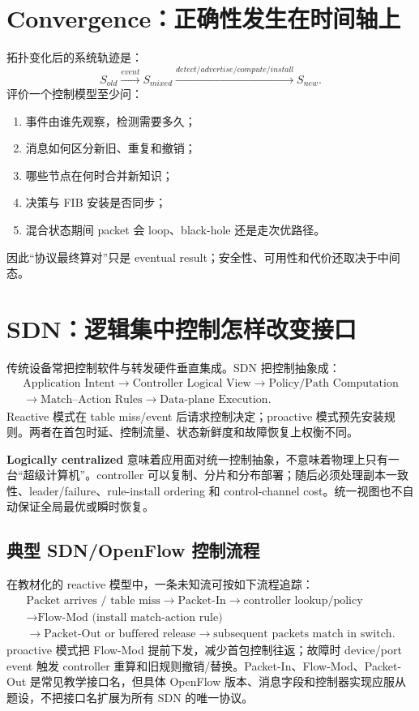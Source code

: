 \documentclass[11pt,a4paper]{ctexart}
\newcommand{\kw}[1]{\textbf{\color{deep}#1}}
\begin{document}
\section{Convergence：正确性发生在时间轴上}

拓扑变化后的系统轨迹是：
\[
S_{old}\xrightarrow{event}S_{mixed}
\xrightarrow{detect/advertise/compute/install}S_{new}.
\]
评价一个控制模型至少问：
\begin{enumerate}
  \item 事件由谁先观察，检测需要多久；
  \item 消息如何区分新旧、重复和撤销；
  \item 哪些节点在何时合并新知识；
  \item 决策与 FIB 安装是否同步；
  \item 混合状态期间 packet 会 loop、black-hole 还是走次优路径。
\end{enumerate}

因此“协议最终算对”只是 eventual result；安全性、可用性和代价还取决于中间态。

\section{SDN：逻辑集中控制怎样改变接口}

传统设备常把控制软件与转发硬件垂直集成。SDN 把控制抽象成：
\[
\begin{gathered}
\text{Application Intent}\to\text{Controller Logical View}\to\text{Policy/Path Computation}\\
\to\text{Match--Action Rules}\to\text{Data-plane Execution}.
\end{gathered}
\]
Reactive 模式在 table miss/event 后请求控制决定；proactive 模式预先安装规则。两者在首包时延、控制流量、状态新鲜度和故障恢复上权衡不同。

\kw{Logically centralized} 意味着应用面对统一控制抽象，不意味着物理上只有一台“超级计算机”。controller 可以复制、分片和分布部署；随后必须处理副本一致性、leader/failure、rule-install ordering 和 control-channel cost。统一视图也不自动保证全局最优或瞬时恢复。

\subsection{典型 SDN/OpenFlow 控制流程}

在教材化的 reactive 模型中，一条未知流可按如下流程追踪：
\[
\begin{gathered}
\text{Packet arrives / table miss}\to\text{Packet-In}\to\text{controller lookup/policy}\\
\to\text{Flow-Mod (install match-action rule)}\\
\to\text{Packet-Out or buffered release}\to\text{subsequent packets match in switch}.
\end{gathered}
\]
proactive 模式把 Flow-Mod 提前下发，减少首包控制往返；故障时 device/port event 触发 controller 重算和旧规则撤销/替换。Packet-In、Flow-Mod、Packet-Out 是常见教学接口名，但具体 OpenFlow 版本、消息字段和控制器实现应服从题设，不把接口名扩展为所有 SDN 的唯一协议。
\end{document}
